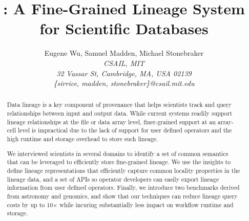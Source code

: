 \documentclass[10pt,conference,letterpaper]{ieee}
\title{\sys{}: A Fine-Grained Lineage System for Scientific Databases}
\author{%
{Eugene Wu, Samuel Madden, Michael Stonebraker }
\vspace{1.6mm}\\
\fontsize{10}{10}\selectfont\itshape
CSAIL, MIT\\
32 Vassar St, Cambridge, MA, USA 02139\\
\fontsize{9}{9}\selectfont\ttfamily\upshape
\{sirrice, madden, stonebraker\}@csail.mit.edu
}
\newcommand{\sys}{SubZero{}}
\begin{document}
\maketitle
\begin{abstract}


Data lineage is a key component of provenance that helps scientists  track and query
relationships between input and output data.  While current systems readily
support lineage relationships at the file or data array level, finer-grained
support at an array-cell level is impractical due to the lack of support
for user defined operators and the high runtime and storage overhead to store
such lineage.


We interviewed scientists in several domains to identify a set of common
semantics that can be leveraged to efficiently store fine-grained lineage.  We
use the insights to define lineage representations that efficiently capture
common locality properties in the lineage data, and a set of APIs so operator
developers can easily export lineage information from user defined operators.
Finally, we introduce two benchmarks derived from astronomy and genomics, and
show that our techniques can reduce lineage query costs by up to 10$\times$
while incuring substantially less impact on workflow runtime and storage.


%



\end{abstract}















{\scriptsize

}
\end{document}
